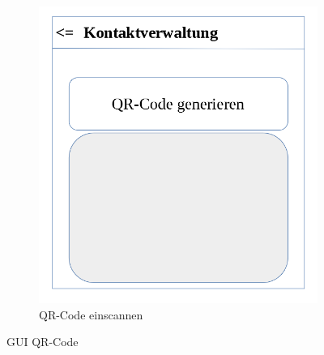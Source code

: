 \begin{figure}[h]
\begin{subfigure}{.5\textwidth}
  \includegraphics[scale=0.3]{gui/Kontaktverwaltung_QR_Code_einscannen.png}
  \caption{QR-Code einscannen}
\end{subfigure}
\caption{GUI QR-Code}
\end{figure}


